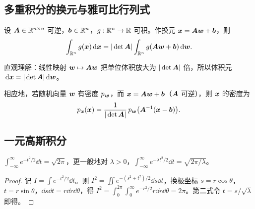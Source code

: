 \subsection{多重积分的换元与雅可比行列式}

\begin{theorem}[线性换元]\label{thm:change-var}
设 $\bm{A}\in\mathbb{R}^{n\times n}$ 可逆，$\bm{b}\in\mathbb{R}^n$，$g:\mathbb{R}^n\to\mathbb{R}$ 可积。作换元 $\bm{x}=\bm{A}\bm{w}+\bm{b}$，则
\[
\int_{\mathbb{R}^n} g(\bm{x})\,\mathrm{d}\bm{x}=|\det\bm{A}|\int_{\mathbb{R}^n} g(\bm{A}\bm{w}+\bm{b})\,\mathrm{d}\bm{w} .
\]
\end{theorem}

直观理解：线性映射 $\bm{w}\mapsto\bm{A}\bm{w}$ 把单位体积放大为 $|\det\bm{A}|$ 倍，所以体积元 $\,\mathrm{d}\bm{x}=|\det\bm{A}|\,\mathrm{d}\bm{w}$。

相应地，若随机向量 $\bm{w}$ 有密度 $p_{\bm{w}}$，而 $\bm{x}=\bm{A}\bm{w}+\bm{b}$（$\bm{A}$ 可逆），则 $\bm{x}$ 的密度为
\begin{equation}\label{eq:density-transform}
p_{\bm{x}}(\bm{x})=\frac{1}{|\det\bm{A}|}\,p_{\bm{w}}\big(\bm{A}^{-1}(\bm{x}-\bm{b})\big).
\end{equation}

\subsection{一元高斯积分}

\begin{lemma}\label{lem:gauss-int}
$\displaystyle\int_{-\infty}^{\infty}e^{-t^2/2}\dd t=\sqrt{2\pi}$，更一般地对 $\lambda>0$，$\displaystyle\int_{-\infty}^{\infty}e^{-\lambda t^2/2}\dd t=\sqrt{2\pi/\lambda}$。
\end{lemma}

\begin{proof}
记 $I=\int e^{-t^2/2}\dd t$。则 $I^2=\iint e^{-(s^2+t^2)/2}\dd s\dd t$，换极坐标 $s=r\cos\theta$，$t=r\sin\theta$，$\dd s\dd t=r\dd r\dd\theta$，得 $I^2=\int_0^{2\pi}\!\int_0^\infty e^{-r^2/2}r\dd r\dd\theta=2\pi$。第二式令 $t=s/\sqrt{\lambda}$ 即得。
\end{proof}

